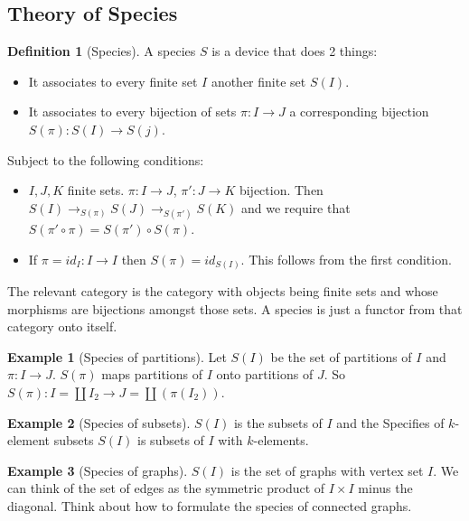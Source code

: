 \documentclass[12pt]{article}
\theoremstyle{definition}
\newtheorem{defn}{Definition}
\newtheorem{exmp}{Example}[section]
\begin{document}
\subsection{Theory of Species}
\begin{defn}[Species]
    A species $S$ is a device that does 2 things:
    \begin{itemize}
        \item It associates to every finite set $I$ another finite set $S(I)$.
        \item It associates to every bijection of sets $\pi: I \rightarrow J$ a
            corresponding bijection $S(\pi): S(I) \rightarrow S(j)$. 
    \end{itemize}
    Subject to the following conditions:
    \begin{itemize}
        \item $I, J, K$ finite sets. $\pi: I \rightarrow J$, $\pi': J
            \rightarrow K$ bijection. Then $S(I) \rightarrow_{S(\pi)} S(J)
            \rightarrow_{S(\pi')} S(K)$ and we require that $S(\pi' \circ \pi)
            = S(\pi') \circ S(\pi)$.
        \item If $\pi = id_I: I \rightarrow I$ then $S(\pi) = id_{S(I)}$. This
            follows from the first condition.
    \end{itemize}
    The relevant category is the category with objects being finite sets and
    whose morphisms are bijections amongst those sets. A species is just a
    functor from that category onto itself.
\end{defn}

\begin{exmp}[Species of partitions]
    Let $S(I)$ be the set of partitions of $I$ and $\pi: I \rightarrow J$.
    $S(\pi)$ maps partitions of $I$ onto partitions of $J$.  So $S(\pi) : I =
    \coprod I_2 \rightarrow J = \coprod(\pi(I_2))$.
\end{exmp}

\begin{exmp}[Species of subsets] 
$S(I)$ is the subsets of $I$ and the Specifies of
$k$-element subsets $S(I)$ is subsets of $I$ with $k$-elements.
\end{exmp}

\begin{exmp}[Species of graphs]
$S(I)$ is the set of graphs with vertex set $I$. We can
think of the set of edges as the symmetric product of $I \times I$ minus the
diagonal. Think about how to formulate the species of connected graphs.
\end{exmp}
\end{document}
